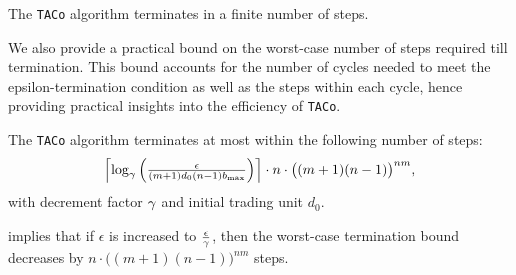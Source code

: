 \begin{theorem} \label{theorem:theorem3}
The \texttt{TACo} algorithm terminates in a finite number of steps.
\end{theorem}

We also provide a practical bound on the worst-case number of steps required till termination. This bound accounts for the number of cycles needed to meet the epsilon-termination condition as well as the steps within each cycle, hence providing practical insights into the efficiency of \texttt{TACo}.

\begin{theorem} \label{theorem:theorem4}
    The \texttt{TACo} algorithm terminates at most within the following number of steps:
    \begin{equation} \label{eq:terminationBound}
        \textstyle{
        \left\lceil \log_{\gamma} \left(\frac{\epsilon}{(m+1)d_0(n-1)b_{\max}} \right) \right\rceil \cdot n \cdot \big((m+1)(n-1)\big)^{nm}},
    \end{equation}
    with decrement factor $\gamma$ and initial trading unit $d_0$.
\end{theorem}

 implies that if $\epsilon$ is increased to $\frac{\epsilon}{\gamma}$, then the worst-case termination bound decreases by $n \cdot \big((m+1)(n-1)\big)^{nm}$ steps. 